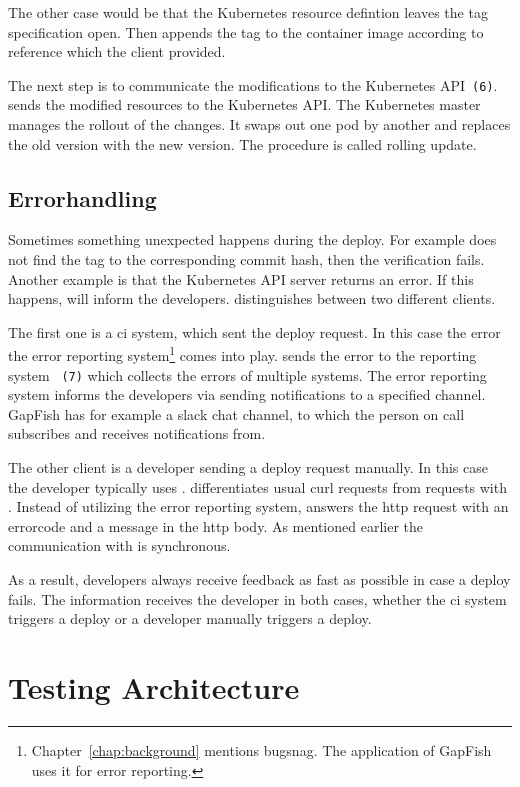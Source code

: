 The other case would be that the Kubernetes resource defintion leaves the tag
specification open. Then \deployer appends the tag to the container image according to
reference which the client provided.

The next step is to communicate the modifications to the Kubernetes
API~\texttt{(6)}. \deployer sends the modified resources to the Kubernetes API. The
Kubernetes master manages the rollout of the changes. It swaps out one pod by another and
replaces the old version with the new version. The procedure is called rolling update.

\subsection{Errorhandling}

Sometimes something unexpected happens during the deploy. For example \deployer does not
find the tag to the corresponding commit hash, then the verification fails. Another
example is that the Kubernetes API server returns an error. If this happens, \deployer will
inform the developers. \deployer distinguishes between two different clients.

The first one is a \gls{ci} system, which sent the deploy request. In this case the error
the error reporting system\footnote{Chapter~\ref{chap:background} mentions bugsnag. The
  application of GapFish uses it for error reporting.} comes into play. \deployer sends the
error to the reporting system ~\texttt{(7)} which collects the errors of multiple
systems. The error reporting system informs the developers via sending notifications to a
specified channel. GapFish has for example a slack chat channel, to which the person on
call subscribes and receives notifications from.

The other client is a developer sending a deploy request manually. In this case the
developer typically uses \depctl. \deployer differentiates usual curl requests from
requests with \depctl. Instead of utilizing the error reporting system, \deployer answers
the http request with an errorcode and a message in the http body. As mentioned earlier
the communication with \deployer is synchronous.

As a result, developers always receive feedback as fast as possible in case a deploy
fails. The information receives the developer in both cases, whether the \gls{ci} system
triggers a deploy or a developer manually triggers a deploy.

\section{Testing Architecture}
\label{test_architecture}

